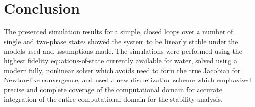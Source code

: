 \documentclass{UWMadThesis}
\begin{document}
    \MakeTitlePage{}
    \begin{LicensePage}
        \CreativeCommons
        \Attribution
        \NonCommercial
        \ShareAlike
    \end{LicensePage}





    \TableOfContents
    \ListOfTables
    \ListOfFigures

    \begin{Acronym}
    \end{Acronym}







\chapter{Conclusion}
The presented simulation results for a simple, closed loops over a number of single and two-phase states showed the system to be linearly stable under the models used and assumptions made.
The simulations were performed using the highest fidelity equations-of-state currently available for water, solved using a modern fully, nonlinear solver which avoids need to form the true Jacobian for Newton-like convergence, and used a new  discretization scheme which emphasized precise and complete coverage of the computational domain for accurate integration of the entire computational domain for the stability analysis.
\end{document}
